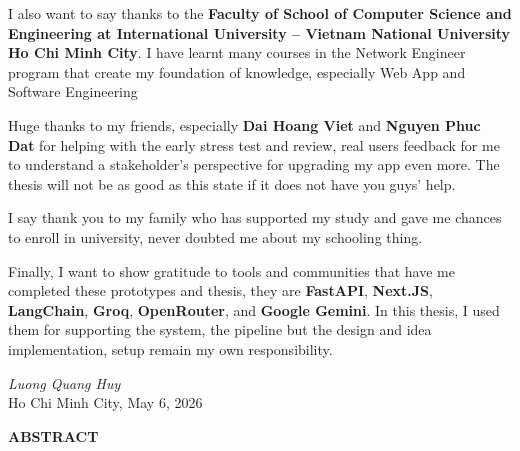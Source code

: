 \documentclass[12pt,a4paper]{article}
\begin{document}
I also want to say thanks to the \textbf{Faculty of School of Computer Science and Engineering at
International University – Vietnam National University Ho Chi Minh City}. I have learnt many courses in the Network Engineer program that create my foundation of knowledge, especially Web App and Software Engineering


Huge thanks to my friends, especially \textbf{Dai Hoang Viet} and \textbf{Nguyen Phuc Dat} for helping with the early stress test and review, real users feedback for me to understand a stakeholder’s perspective for upgrading my app even more. The thesis will not be as good as this state if it does not have you guys’ help.

I say thank you to my family who has supported my study and gave me chances to enroll in university, never doubted me about my schooling thing.

Finally, I want to show gratitude to tools and communities that have me completed these prototypes and thesis, they are \textbf{FastAPI}, \textbf{Next.JS}, \textbf{LangChain}, \textbf{Groq}, \textbf{OpenRouter}, and \textbf{Google Gemini}. In this thesis, I used them for supporting the system, the pipeline but the design and idea implementation, setup remain my own responsibility.

\vspace{0.6cm}

\enlargethispage{2\baselineskip}

\begin{flushright}
\begin{minipage}{0.45\linewidth}
  \raggedleft
  \singlespacing
  \textit{Luong Quang Huy}\\[0.25cm]
  Ho Chi Minh City, May 6, 2026
\end{minipage}
\end{flushright}


\newpage
\tableofcontents

\newpage
\listoftables

\newpage
\listoffigures


\newpage
\begin{center}
  \textbf{ABSTRACT}
\end{center}
\end{document}
